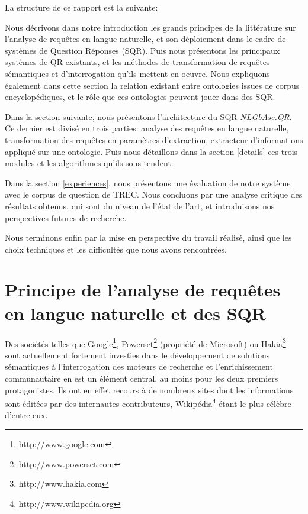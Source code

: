 \documentclass[10pt,a4paper]{article}
\begin{document}
\par La structure de ce rapport est la suivante: 

\par Nous décrivons dans notre introduction les grands principes de la littérature sur l'analyse de requêtes en langue naturelle, et son déploiement dans le cadre de systèmes de Question Réponses (SQR). Puis nous présentons les principaux systèmes de QR existants, et les méthodes de transformation de requêtes sémantiques et d'interrogation qu'ils mettent en oeuvre. Nous expliquons également dans cette section la relation existant entre ontologies issues de corpus encyclopédiques, et le rôle que ces ontologies peuvent jouer dans des SQR. 
\par Dans la section suivante, nous présentons l'architecture du SQR \textit{NLGbAse.QR}. Ce dernier est divisé en trois parties: analyse des requêtes en langue naturelle, transformation des requêtes en paramètres d'extraction, extracteur d'informations appliqué sur une ontologie. Puis nous détaillons dans la section \ref{details} ces trois modules et les algorithmes qu'ils sous-tendent. 
\par Dans la section \ref{experiences}, nous présentons une évaluation de notre système avec le corpus de question de TREC. Nous concluons par une analyse critique des résultats obtenus, qui sont du niveau de l'état de l'art, et introduisons nos perspectives futures de recherche. 
\par Nous terminons enfin par la mise en perspective du travail réalisé, ainsi que les choix techniques et les difficultés que nous avons rencontrées.

\section{Principe de l'analyse de requêtes en langue naturelle et des SQR}
\par Des sociétés telles que Google\footnote{http://www.google.com}, Powerset\footnote{http://www.powerset.com} (propriété de Microsoft) ou Hakia\footnote{http://www.hakia.com} sont actuellement fortement investies dans le développement de solutions sémantiques à l'interrogation des moteurs de recherche et l'enrichissement communautaire en est un élément central, au moins pour les deux premiers protagonistes. Ils ont en effet recours à de nombreux sites dont les informations sont éditées par des internautes contributeurs, Wikipédia\footnote{http://www.wikipedia.org} étant le plus célèbre d'entre eux.
\end{document}

